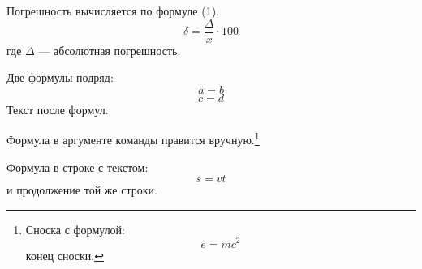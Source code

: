 Погрешность вычисляется по формуле (1).
\begin{equation} %
  \delta = \frac{\Delta}{x} \cdot 100
\end{equation}
где $\Delta$ — абсолютная погрешность.

Две формулы подряд:
\begin{equation} %
  a = b
\end{equation}
\begin{equation} %
  c = d
\end{equation}
Текст после формул.

Формула в аргументе команды правится вручную.\footnote{Сноска с формулой:
\begin{equation} %
  e = mc^2
\end{equation}
конец сноски.}

Формула в строке с текстом: \begin{equation} %
  s = vt
\end{equation} и продолжение той же строки.
